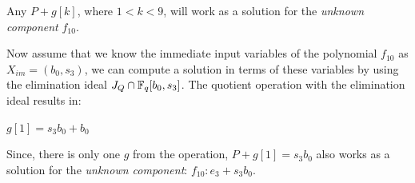 \begin{Example}
Any $P+g[k]$, where $1<k<9$, will work as a solution for the
\textit{unknown component} $f_{10}$. 

Now assume that we know the immediate input variables of the
polynomial $f_{10}$ as $X_{im} = (b_0,s_3)$, we can compute a solution
in terms of these variables by using the elimination
ideal $J_Q \cap {\mathbb{F}}_{q}[b_0,s_3]$. The quotient
operation with the elimination ideal results in:\\ 
\begin{small}
$g[1]=s_3b_0 + b_0$
\end{small}

Since, there is only one $g$ from the operation, $P+g[1]=s_3b_0$ also
works as a solution for the \textit{unknown component}: $f_{10}: e_3 +
s_3b_0$. 

\end{Example}



